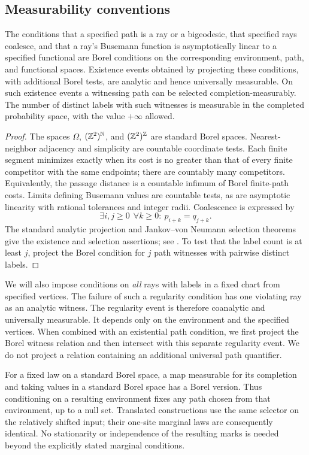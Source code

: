 \subsection{Measurability conventions}
\begin{lemma}\label{lem:measurable}
The conditions that a specified path is a ray or a bigeodesic,
that specified rays coalesce, and that a ray's Busemann function is
asymptotically linear to a specified functional are Borel conditions
on the corresponding environment, path, and functional spaces.
Existence events obtained by projecting these conditions, with
additional Borel tests, are analytic and hence universally measurable.
On such existence events a witnessing path can be selected
completion-measurably.
The number of distinct labels with such witnesses is measurable in
the completed probability space, with the value \(+\infty\) allowed.
\end{lemma}
\begin{proof}
The spaces \(\Omega\), \((\mathbb Z^2)^{\mathbb N}\), and
\((\mathbb Z^2)^{\mathbb Z}\) are standard Borel spaces.
Nearest-neighbor adjacency and simplicity are countable coordinate
tests. Each finite segment minimizes exactly when its cost is no
greater than that of every finite competitor with the same endpoints;
there are countably many competitors. Equivalently, the passage
distance is a countable infimum of Borel finite-path costs.
Limits defining Busemann values are countable tests, as are
asymptotic linearity with rational tolerances and integer radii.
Coalescence is expressed by
\[
 \exists i,j\ge0\ \ \forall k\ge0:\ p_{i+k}=q_{j+k}.
\]
The standard analytic projection and Jankov--von Neumann selection
theorems give the existence and selection assertions; see
\cite[Theorems 29.7 and 29.9]{Kechris}.
To test that the label count is at least \(j\), project the Borel
condition for \(j\) path witnesses with pairwise distinct labels.
\end{proof}

We will also impose conditions on \emph{all} rays with labels in a
fixed chart from specified vertices. The failure of such a regularity
condition has one violating ray as an analytic witness.
The regularity event is therefore coanalytic and universally measurable.
It depends only on the environment and the specified vertices.
When combined with an existential path condition, we first project the
Borel witness relation and then intersect with this separate regularity
event. We do not project a relation containing an additional universal
path quantifier.

For a fixed law on a standard Borel space, a map measurable for its
completion and taking values in a standard Borel space has a Borel
version. Thus conditioning on a resulting environment fixes any path
chosen from that environment, up to a null set. Translated constructions
use the same selector on the relatively shifted input; their one-site
marginal laws are consequently identical. No stationarity or
independence of the resulting marks is needed beyond the explicitly
stated marginal conditions.
